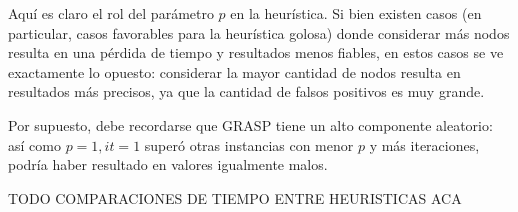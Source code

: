 Aquí es claro el rol del parámetro $p$ en la heurística. Si bien existen casos (en particular, casos favorables para la heurística golosa) donde considerar más nodos resulta en una pérdida de tiempo y resultados menos fiables, en estos casos se ve exactamente lo opuesto: considerar la mayor cantidad de nodos resulta en resultados más precisos, ya que la cantidad de falsos positivos es muy grande.

Por supuesto, debe recordarse que GRASP tiene un alto componente aleatorio: así como $p = 1, it = 1$ superó otras instancias con menor $p$ y más iteraciones, podría haber resultado en valores igualmente malos.


TODO COMPARACIONES DE TIEMPO ENTRE HEURISTICAS ACA